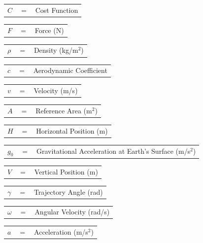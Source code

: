 \documentclass[]{aiaa-tc}
\begin{document}
	  	\begin{tabular}{p{1.2cm}p{1cm}p{5cm}}
	  $C$ & $=$ & Cost Function\\
	  	\end{tabular} 
	  	\begin{tabular}{p{1.2cm}p{1cm}p{5cm}}
	  $F$ & $=$ & Force (N)\\
	  	\end{tabular} 
	  	\begin{tabular}{p{1.2cm}p{1cm}p{5cm}}
	  $\rho$ & $=$ & Density (kg/m$^2$)\\
	  	\end{tabular} 
	  	\begin{tabular}{p{1.2cm}p{1cm}p{5cm}}
	  $c$ & $=$ & Aerodynamic Coefficient\\
	  	\end{tabular} 
	  	\begin{tabular}{p{1.2cm}p{1cm}p{5cm}}
	  $v$ & $=$ & Velocity (m/s)\\
	  	\end{tabular} 
	  	\begin{tabular}{p{1.2cm}p{1cm}p{5cm}}
	  $A$ & $=$ & Reference Area (m$^2$)\\
	  	\end{tabular} 
	  	\begin{tabular}{p{1.2cm}p{1cm}p{5cm}}
	  $H$ & $=$ & Horizontal Position (m)\\
	  	\end{tabular} 
	  	\begin{tabular}{p{1.2cm}p{1cm}p{5cm}}
	  		$g_0$ & $=$ & Gravitational Acceleration at Earth's Surface (m/s$^2$)\\
	  	\end{tabular} 
	  	\begin{tabular}{p{1.2cm}p{1cm}p{5cm}}

	
	$V$ & $=$ & Vertical Position (m)\\
		\end{tabular} 
		\begin{tabular}{p{1.2cm}p{1cm}p{5cm}}
	  $\gamma$ & $=$ & Trajectory Angle (rad)\\
	  	\end{tabular} 
	  	\begin{tabular}{p{1.2cm}p{1cm}p{5cm}}
	  $\omega$ & $=$ & Angular Velocity (rad/s)\\
	  	\end{tabular} 
	  	\begin{tabular}{p{1.2cm}p{1cm}p{5cm}}
	  $a$ & $=$ & Acceleration (m/s$^2$)\\
	  	\end{tabular} 
\end{document}
